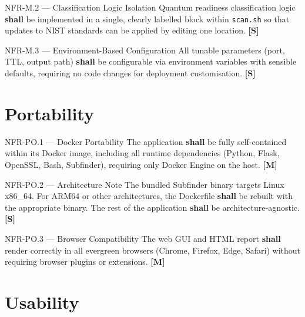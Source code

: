 \begin{reqbox}{NFR-M.2 — Classification Logic Isolation}
  Quantum readiness classification logic \textbf{shall} be implemented in a
  single, clearly labelled block within \texttt{scan.sh} so that updates
  to NIST standards can be applied by editing one location. \hfill \textbf{[S]}
\end{reqbox}

\begin{reqbox}{NFR-M.3 — Environment-Based Configuration}
  All tunable parameters (port, TTL, output path) \textbf{shall} be
  configurable via environment variables with sensible defaults, requiring
  no code changes for deployment customisation. \hfill \textbf{[S]}
\end{reqbox}

\section{Portability}
\label{sec:portability}

\begin{reqbox}{NFR-PO.1 — Docker Portability}
  The application \textbf{shall} be fully self-contained within its Docker
  image, including all runtime dependencies (Python, Flask, OpenSSL, Bash,
  Subfinder), requiring only Docker Engine on the host. \hfill \textbf{[M]}
\end{reqbox}

\begin{reqbox}{NFR-PO.2 — Architecture Note}
  The bundled Subfinder binary targets Linux x86\_64. For ARM64 or other
  architectures, the Dockerfile \textbf{shall} be rebuilt with the appropriate
  binary. The rest of the application \textbf{shall} be architecture-agnostic.
  \hfill \textbf{[S]}
\end{reqbox}

\begin{reqbox}{NFR-PO.3 — Browser Compatibility}
  The web GUI and HTML report \textbf{shall} render correctly in all
  evergreen browsers (Chrome, Firefox, Edge, Safari) without requiring
  browser plugins or extensions. \hfill \textbf{[M]}
\end{reqbox}

\section{Usability}
\label{sec:usability}

